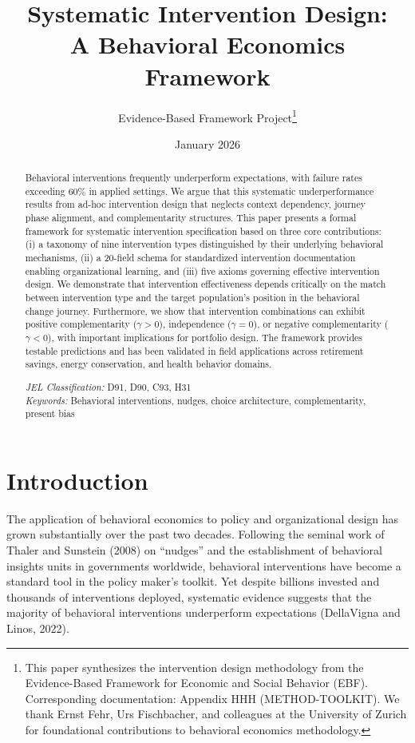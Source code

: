 \documentclass[12pt,a4paper]{article}
\title{\Large\textbf{Systematic Intervention Design:\\A Behavioral Economics Framework}}
\author{
Evidence-Based Framework Project\thanks{This paper synthesizes the intervention design methodology from the Evidence-Based Framework for Economic and Social Behavior (EBF). Corresponding documentation: Appendix HHH (METHOD-TOOLKIT). We thank Ernst Fehr, Urs Fischbacher, and colleagues at the University of Zurich for foundational contributions to behavioral economics methodology.}
}
\date{January 2026}
\begin{document}
\maketitle

\begin{abstract}
\noindent Behavioral interventions frequently underperform expectations, with failure rates exceeding 60\% in applied settings. We argue that this systematic underperformance results from ad-hoc intervention design that neglects context dependency, journey phase alignment, and complementarity structures. This paper presents a formal framework for systematic intervention specification based on three core contributions: (i) a taxonomy of nine intervention types distinguished by their underlying behavioral mechanisms, (ii) a 20-field schema for standardized intervention documentation enabling organizational learning, and (iii) five axioms governing effective intervention design. We demonstrate that intervention effectiveness depends critically on the match between intervention type and the target population's position in the behavioral change journey. Furthermore, we show that intervention combinations can exhibit positive complementarity ($\gamma > 0$), independence ($\gamma = 0$), or negative complementarity ($\gamma < 0$), with important implications for portfolio design. The framework provides testable predictions and has been validated in field applications across retirement savings, energy conservation, and health behavior domains.

\vspace{1em}
\noindent\textit{JEL Classification:} D91, D90, C93, H31\\
\textit{Keywords:} Behavioral interventions, nudges, choice architecture, complementarity, present bias
\end{abstract}

\newpage

\section{Introduction}

The application of behavioral economics to policy and organizational design has grown substantially over the past two decades. Following the seminal work of Thaler and Sunstein (2008) on ``nudges'' and the establishment of behavioral insights units in governments worldwide, behavioral interventions have become a standard tool in the policy maker's toolkit. Yet despite billions invested and thousands of interventions deployed, systematic evidence suggests that the majority of behavioral interventions underperform expectations (DellaVigna and Linos, 2022).
\end{document}
